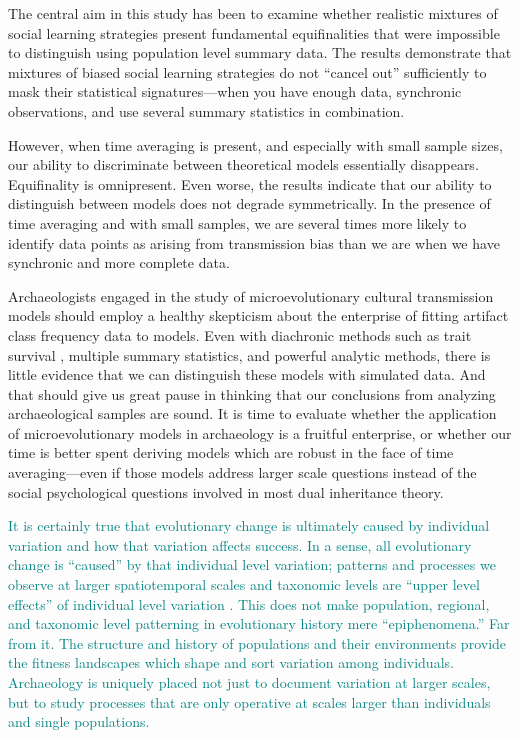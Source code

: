 The central aim in this study has been to examine whether realistic mixtures of social learning strategies present fundamental equifinalities that were impossible to distinguish using population level summary data.  The results demonstrate that mixtures of biased social learning strategies do not ``cancel out'' sufficiently to mask their statistical signatures---when you have enough data, synchronic observations, and use several summary statistics in combination.  

However, when time averaging is present, and especially with small sample sizes, our ability to discriminate between theoretical models essentially disappears.  Equifinality is omnipresent.  Even worse, the results indicate that our ability to distinguish between models does not degrade symmetrically.  In the presence of time averaging and with small samples, we are several times more likely to identify data points as arising from transmission bias than we are when we have synchronic and more complete data.  

Archaeologists engaged in the study of microevolutionary cultural transmission models should employ a healthy skepticism about the enterprise of fitting artifact class frequency data to models.  Even with diachronic methods such as trait survival \citep{Kandler2013}, multiple summary statistics, and powerful analytic methods, there is little evidence that we can distinguish these models with simulated data.  And that should give us great pause in thinking that our conclusions from analyzing archaeological samples are sound.  It is time to evaluate whether the application of microevolutionary models in archaeology is a fruitful enterprise, or whether our time is better spent deriving models which are robust in the face of time averaging---even if those models address larger scale questions instead of the social psychological questions involved in most dual inheritance theory.  

\textcolor{teal}{It is certainly true that evolutionary change is ultimately caused by individual variation and how that variation affects success.   In a sense, all evolutionary change is ``caused'' by that individual level variation; patterns and processes we observe at larger spatiotemporal scales and taxonomic levels are ``upper level effects'' of individual level variation \citep{walsh2019paradox}.  This does not make population, regional, and taxonomic level patterning in evolutionary history mere ``epiphenomena.''  Far from it.  The structure and history of populations and their environments provide the fitness landscapes which shape and sort variation among individuals.  Archaeology is uniquely placed not just to document variation at larger scales, but to study processes that are only operative at scales larger than individuals and single populations.}  

